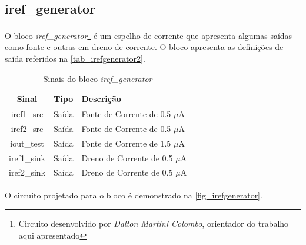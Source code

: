 \renewcommand{\NomeBloco}{\textit{iref\_generator}}
\renewcommand{\NomeBlocoNoUnderline}{irefgenerator}
\renewcommand{\NomePTab}{tab_\NomeBlocoNoUnderline}
\renewcommand{\NomeSTab}{tab_\NomeBlocoNoUnderline2}
\renewcommand{\NomePFig}{fig_\NomeBlocoNoUnderline}
\renewcommand{\NomeSFig}{fig_\NomeBlocoNoUnderline2}
\renewcommand{\NomeTTab}{tab_\NomeBlocoNoUnderline3}
\renewcommand{\NomeQTab}{tab_\NomeBlocoNoUnderline4}

\subsection{iref\_generator}

\clearpage

O bloco \NomeBloco{}\footnote{Circuito desenvolvido por \textit{Dalton Martini Colombo}, orientador do trabalho aqui apresentado} \'e um espelho de corrente que apresenta algumas sa\'idas como fonte e outras em dreno de corrente. O bloco apresenta as definições de sa\'ida referidos na \autoref{\NomeSTab}.

\begin{table}[!h]
\caption{Sinais do bloco \NomeBloco}
\label{\NomeSTab}
\centering
\begin{tabular}{ccl}

    \toprule
    Sinal & Tipo    & Descrição        \\
    \midrule \midrule
    iref1\_src   & Saída   & Fonte de Corrente de 0.5 $\mu$A \\
    \midrule
    iref2\_src   & Saída   & Fonte de Corrente de 0.5 $\mu$A \\
    \midrule
    iout\_test   & Saída   & Fonte de Corrente de 1.5 $\mu$A \\
    \midrule
    iref1\_sink   & Saída   & Dreno de Corrente de 0.5 $\mu$A \\
    \midrule
    iref2\_sink   & Saída   & Dreno de Corrente de 0.5 $\mu$A \\
    \bottomrule
\end{tabular}
\end{table}

O circuito projetado para o bloco \'e demonstrado na \autoref{\NomePFig}.

